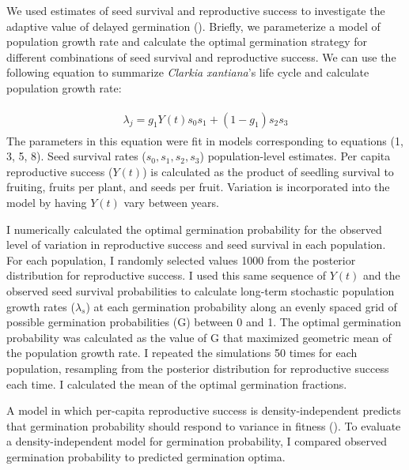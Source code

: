 \documentclass[12pt, oneside, titlepage]{article}   	%
\begin{document}
We used estimates of seed survival and reproductive success to investigate the adaptive value of delayed germination (\cite{gremer2014}). Briefly, we parameterize a model of population growth rate and calculate the optimal germination strategy for different combinations of seed survival and reproductive success. We can use the following equation to summarize \textit{Clarkia xantiana}'s life cycle and calculate population growth rate:

\begin{align}
  \begin{split}
\lambda_{j} = g_1 Y(t) s_0 s_1 + (1-g_1) s_2 s_3 
  \end{split}
\end{align}
%
The parameters in this equation were fit in models corresponding to equations (1, 3, 5, 8). Seed survival rates ($s_0, s_1, s_2, s_3$) population-level estimates. Per capita reproductive success ($Y(t)$) is calculated as the product of seedling survival to fruiting, fruits per plant, and seeds per fruit. Variation is incorporated into the model by having $Y(t)$ vary between years.

I numerically calculated the optimal germination probability for the observed level of variation in reproductive success and seed survival in each population. For each population, I randomly selected values 1000 from the posterior distribution for reproductive success. I used this same sequence of $Y(t)$ and the observed seed survival probabilities to calculate long-term stochastic population growth rates ($\lambda_s$) at each germination probability along an evenly spaced grid of possible germination probabilities (G) between 0 and 1. The optimal germination probability was calculated as the value of G that maximized geometric mean of the population growth rate. I repeated the simulations 50 times for each population, resampling from the posterior distribution for reproductive success each time. I calculated the mean of the optimal germination fractions. 

A model in which per-capita reproductive success is density-independent predicts that germination probability should respond to variance in fitness (\cite{cohen1966}). To evaluate a density-independent model for germination probability, I compared observed germination probability to predicted germination optima.
\end{document}
